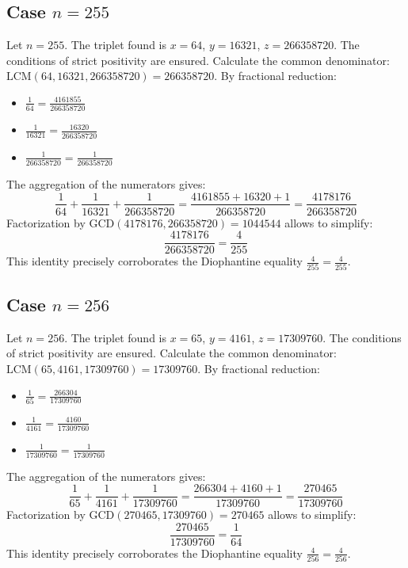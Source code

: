 \documentclass[11pt,a4paper]{article}
\begin{document}
\subsection{Case $n = 255$}
Let $n = 255$. The triplet found is $x = 64$, $y = 16321$, $z = 266358720$.
The conditions of strict positivity are ensured.
Calculate the common denominator: $\text{LCM}(64, 16321, 266358720) = 266358720$.
By fractional reduction:
\begin{itemize}
    \item $\frac{1}{64} = \frac{4161855}{266358720}$
    \item $\frac{1}{16321} = \frac{16320}{266358720}$
    \item $\frac{1}{266358720} = \frac{1}{266358720}$
\end{itemize}
The aggregation of the numerators gives:
$$ \frac{1}{64} + \frac{1}{16321} + \frac{1}{266358720} = \frac{4161855 + 16320 + 1}{266358720} = \frac{4178176}{266358720} $$
Factorization by $\text{GCD}(4178176, 266358720) = 1044544$ allows to simplify:
$$ \frac{4178176}{266358720} = \frac{4}{255} $$
This identity precisely corroborates the Diophantine equality $\frac{4}{255} = \frac{4}{255}$.

\subsection{Case $n = 256$}
Let $n = 256$. The triplet found is $x = 65$, $y = 4161$, $z = 17309760$.
The conditions of strict positivity are ensured.
Calculate the common denominator: $\text{LCM}(65, 4161, 17309760) = 17309760$.
By fractional reduction:
\begin{itemize}
    \item $\frac{1}{65} = \frac{266304}{17309760}$
    \item $\frac{1}{4161} = \frac{4160}{17309760}$
    \item $\frac{1}{17309760} = \frac{1}{17309760}$
\end{itemize}
The aggregation of the numerators gives:
$$ \frac{1}{65} + \frac{1}{4161} + \frac{1}{17309760} = \frac{266304 + 4160 + 1}{17309760} = \frac{270465}{17309760} $$
Factorization by $\text{GCD}(270465, 17309760) = 270465$ allows to simplify:
$$ \frac{270465}{17309760} = \frac{1}{64} $$
This identity precisely corroborates the Diophantine equality $\frac{4}{256} = \frac{4}{256}$.
\end{document}
